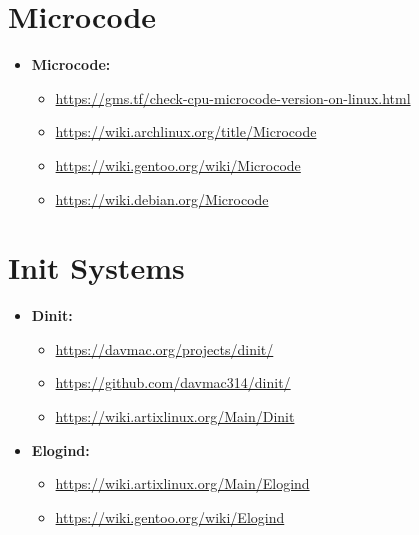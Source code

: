 \documentclass[10pt, a4paper, onecolumn, oneside, titlepage, openany]{book}
\begin{document}
\section{Microcode}
\begin{itemize}
    \item \textbf{Microcode:}
    \begin{itemize}
        \item \url{https://gms.tf/check-cpu-microcode-version-on-linux.html}
        \item \url{https://wiki.archlinux.org/title/Microcode}
        \item \url{https://wiki.gentoo.org/wiki/Microcode}
        \item \url{https://wiki.debian.org/Microcode}
    \end{itemize}
\end{itemize}

\section{Init Systems}
\begin{itemize}
    \item \textbf{Dinit:}
    \begin{itemize}
        \item \url{https://davmac.org/projects/dinit/}
        \item \url{https://github.com/davmac314/dinit/}
        \item \url{https://wiki.artixlinux.org/Main/Dinit}
    \end{itemize}
    \item \textbf{Elogind:}
    \begin{itemize}
        \item \url{https://wiki.artixlinux.org/Main/Elogind}
        \item \url{https://wiki.gentoo.org/wiki/Elogind}
    \end{itemize}
\end{itemize}
\end{document}
